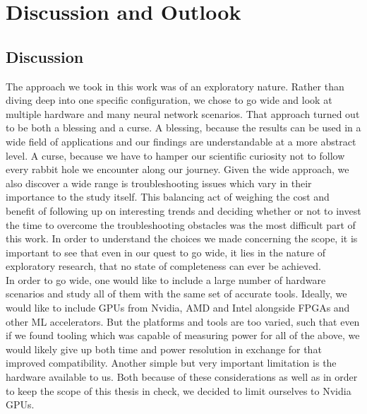 \chapter{Discussion and Outlook}\label{chap:discussion}

\section{Discussion}

The approach we took in this work was of an exploratory nature. Rather than diving deep into one specific configuration, we chose to go wide and look at multiple hardware and many neural network scenarios. That approach turned out to be both a blessing and a curse. A blessing, because the results can be used in a wide field of applications and our findings are understandable at a more abstract level. A curse, because we have to hamper our scientific curiosity not to follow every rabbit hole we encounter along our journey. Given the wide approach, we also discover a wide range is troubleshooting issues which vary in their importance to the study itself. This balancing act of weighing the cost and benefit of following up on interesting trends and deciding whether or not to invest the time to overcome the troubleshooting obstacles was the most difficult part of this work. In order to understand the choices we made concerning the scope, it is important to see that even in our quest to go wide, it lies in the nature of exploratory research, that no state of completeness can ever be achieved. \\
In order to go wide, one would like to include a large number of hardware scenarios and study all of them with the same set of accurate tools. Ideally, we would like to include GPUs from Nvidia, AMD and Intel alongside FPGAs and other ML accelerators. But the platforms and tools are too varied, such that even if we found tooling which was capable of measuring power for all of the above, we would likely give up both time and power resolution in exchange for that improved compatibility. Another simple but very important limitation is the hardware available to us. Both because of these considerations as well as in order to keep the scope of this thesis in check, we decided to limit ourselves to Nvidia GPUs. \\
